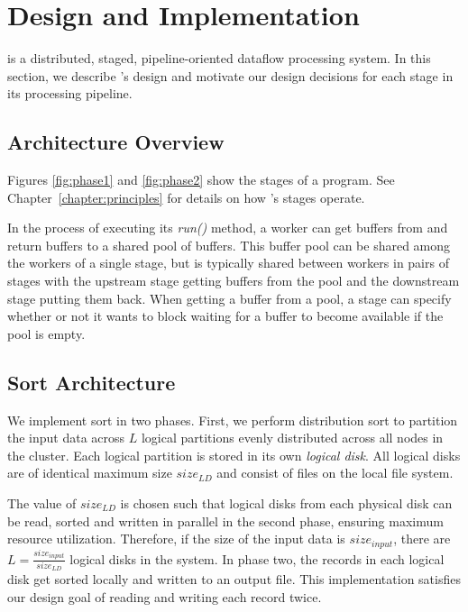 \section{Design and Implementation}
\label{sec:arch}

\tritonsort is a distributed, staged, pipeline-oriented dataflow processing
system. In this section, we describe \tritonsort's design and motivate our
design decisions for each stage in its processing pipeline.

\subsection{Architecture Overview}

Figures \ref{fig:phase1} and \ref{fig:phase2} show the stages of a \tritonsort
program.  See Chapter~\ref{chapter:principles} for details on how \tritonsort's
stages operate.

In the process of executing its \textit{run()} method, a worker can get buffers
from and return buffers to a shared pool of buffers.  This buffer pool can be
shared among the workers of a single stage, but is typically shared between
workers in pairs of stages with the upstream stage getting buffers from the
pool and the downstream stage putting them back.  When getting a buffer from a
pool, a stage can specify whether or not it wants to block waiting for a buffer
to become available if the pool is empty.

\subsection{Sort Architecture}

We implement sort in two phases.  First, we perform distribution sort to
partition the input data across $L$ logical partitions evenly distributed
across all nodes in the cluster.  Each logical partition is stored in
its own \emph{logical disk}.  All logical disks are of identical maximum size
$size_{LD}$ and consist of files on the local file system.

The value of $size_{LD}$ is chosen such that logical disks
from each physical disk can be read, sorted and written in parallel in the
second phase, ensuring maximum resource utilization.  Therefore, if the size of
the input data is $size_{input}$, there are $L =
\frac{size_{input}}{size_{LD}}$ logical disks in the system.  In phase two, the
records in each logical disk get sorted locally and written to an output file.
This implementation satisfies our design goal of reading and writing each record
twice.

